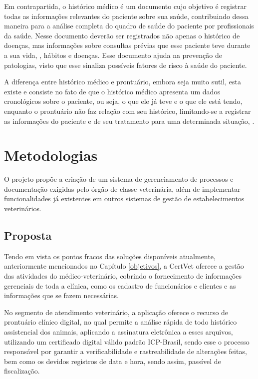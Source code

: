 \documentclass[
    12pt,               %
    openright,          %
    oneside,
    a4paper,            %
    BIBLATEX,           %
    TODO,               %
    english,            %
    brazil              %
    ]{ifsp-spo-inf-ctds}
\begin{document}
    Em contrapartida, o histórico médico é um documento cujo objetivo é registrar todas as informações relevantes do paciente sobre sua saúde, contribuindo dessa maneira para a análise completa do quadro de saúde do paciente por profissionais da saúde. Nesse documento deverão ser registrados não apenas o histórico de doenças, mas informações sobre consultas prévias que esse paciente teve durante a sua vida, , hábitos e doenças. Esse documento ajuda na prevenção de patologias, visto que esse sinaliza possíveis fatores de risco à saúde do paciente. %

    A diferença entre histórico médico e prontuário, embora seja muito sutil, esta existe e consiste no fato de que o histórico médico apresenta um dados cronológicos sobre o paciente, ou seja, o que ele já teve e o que ele está tendo, enquanto o prontuário não faz relação com seu histórico, limitando-se a registrar as informações do paciente e de seu tratamento para uma determinada situação, . 

\chapter[Metodologias]{Metodologias}

    O projeto propõe a criação de um sistema de gerenciamento de processos e documentação exigidas pelo órgão de classe veterinária, além de implementar funcionalidades já existentes em outros sistemas de gestão de estabelecimentos veterinários. 

    \section{Proposta}

        Tendo em vista os pontos fracos das soluções disponíveis atualmente, anteriormente mencionados no Capítulo \ref{objetivos}, a CertVet oferece a gestão das atividades do médico-veterinário, cobrindo o fornecimento de informações gerenciais de toda a clínica, como os cadastro de funcionários e clientes e as informações que se fazem necessárias. 

        No segmento de atendimento veterinário, a aplicação oferece o recurso de prontuário clínico digital, no qual permite a análise rápida de todo histórico assistencial dos animais, aplicando a assinatura eletrônica a esses arquivos, utilizando um certificado digital válido padrão ICP-Brasil, sendo esse o processo responsável por garantir a verificabilidade e rastreabilidade de alterações feitas, bem como os devidos registros de data e hora, sendo assim, passível de fiscalização.
\end{document}
